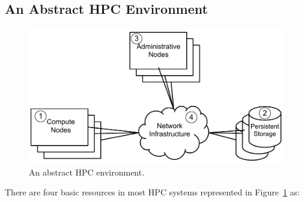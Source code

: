 \documentclass{article}
\begin{document}
\subsection{An Abstract HPC Environment}
\begin{figure}
\centering
\includegraphics[scale=0.5]{abstract_hpc_environment.pdf}
\caption{An abstract HPC environment.}
\label{fig:abstract_hpc_environment}
\end{figure}
There are four basic resources in most HPC systems represented in Figure~\ref{fig:abstract_hpc_environment} as: 
\end{document}

